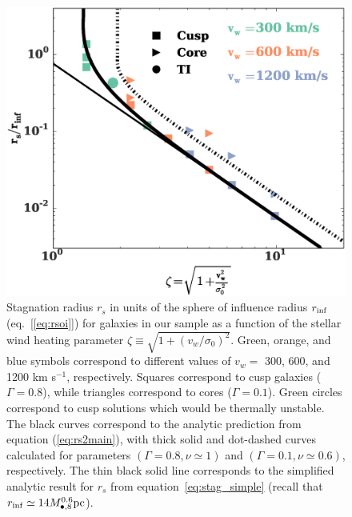 \documentclass[usenatbib,fleqn]{mn2e}
\newcommand{\rs}{r_s}
\newcommand{\Mbheight}{M_{\bullet,8}}
\newcommand{\rinf}{r_{\rm inf}}
\newcommand{\densSlope}{\nu}
\begin{document}
\begin{figure}
  \includegraphics[width=\columnwidth]{rs.eps}
  \caption{\label{fig:stag} Stagnation radius $r_{s}$ in units of the
    sphere of influence radius $r_{\rm inf}$ (eq.~[\ref{eq:rsoi}]) for
    galaxies in our sample as a function of the stellar wind heating
    parameter $\zeta \equiv \sqrt{1+(v_w/\sigma_0)^{2}}$.  Green,
    orange, and blue symbols correspond to different values of $v_{w}
    =$ 300, 600, and 1200 km s$^{-1}$, respectively.  Squares
    correspond to cusp galaxies ($\Gamma = 0.8$), while triangles
    correspond to cores ($\Gamma = 0.1$). Green circles correspond to
    cusp solutions which would be thermally unstable.  The black
    curves correspond to the analytic prediction from equation
    (\ref{eq:rs2main}), with thick solid and dot-dashed curves
    calculated for parameters $(\Gamma=0.8, \densSlope\simeq 1)$ and
    $(\Gamma=0.1,\densSlope\simeq0.6)$, respectively. The thin black
    solid line corresponds to the simplified analytic result for $\rs$
    from equation~\eqref{eq:stag_simple} (recall that $\rinf \simeq 14
    \Mbheight^{0.6} {\rm pc}$).}
\end{figure}
\end{document}
